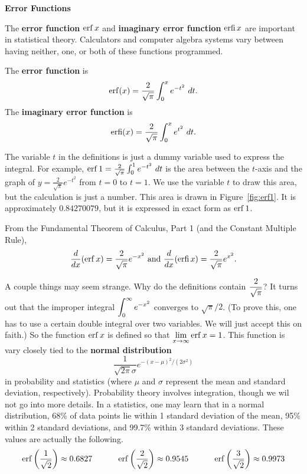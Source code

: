 \noindent\textbf{\large Error Functions}

The \textbf{error function} $\operatorname{erf} x$ and \textbf{imaginary error function} $\operatorname{erfi} x$ are important in statistical theory.  Calculators and computer algebra systems vary between having neither, one, or both of these functions programmed.

{The \textbf{error function} is $$\erf(x) = \frac{2}{\sqrt{\pi}} \int_0^x e^{-t^2}\ dt.$$
The \textbf{imaginary error function} is $$\erfi(x) = \frac{2}{\sqrt{\pi}} \int_0^x e^{t^2}\ dt.$$
}

The variable $t$ in the definitions is just a dummy variable used to express the integral.  For example, $\operatorname{erf} 1 = \frac{2}{\sqrt{\pi}} \int_0^1 e^{-t^2}\ dt$ is the area between the $t$-axis and the graph of $y=\frac{2}{\sqrt{\pi}} e^{-t^2}$ from $t=0$ to $t=1$.  We use the variable $t$ to draw this area, but the calculation is just a number.  This area is drawn in Figure~\ref{fig:erf1}.  It is approximately $0.84270079$, but it is expressed in exact form as $\operatorname{erf} 1$.


From the Fundamental Theorem of Calculus, Part 1 (and the Constant Multiple Rule),
$$\frac{d}{dx} (\operatorname{erf} x) = \frac{2}{\sqrt{\pi}}e^{-x^2} \text{ and } \frac{d}{dx} (\operatorname{erfi} x) = \frac{2}{\sqrt{\pi}}e^{x^2}.$$

A couple things may seem strange.  Why do the definitions contain $\displaystyle \frac{2}{\sqrt{\pi}}$?  It turns out that the improper integral $\displaystyle \int_0^\infty e^{-x^2}$ converges to $\sqrt{\pi}/2$.  (To prove this, one has to use a certain double integral over two variables.  We will just accept this on faith.)  So the function $\operatorname{erf} x$ is defined so that $\lim\limits_{x\to \infty} \operatorname{erf} x = 1$.  This function is vary closely tied to the \textbf{normal distribution}
$$\frac{1}{\sqrt{2\pi} \sigma}e^{-(x-\mu)^2/(2\sigma^2)}$$ in probability and statistics (where $\mu$ and $\sigma$ represent the mean and standard deviation, respectively).  Probability theory involves integration, though we wil not go into more details.  In a statistics, one may learn that in a normal distribution, 68\% of data points lie within 1 standard deviation of the mean, 95\% within 2 standard deviations, and 99.7\% within 3 standard deviations.  These values are actually the following.
$$\operatorname{erf}\left(\frac{1}{\sqrt{2}}\right)\approx 0.6827\quad\quad\quad \operatorname{erf}\left(\frac{2}{\sqrt{2}}\right)\approx 0.9545
\quad\quad\quad \operatorname{erf}\left(\frac{3}{\sqrt{2}}\right)\approx 0.9973$$

